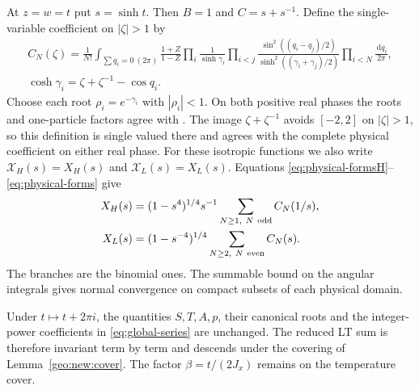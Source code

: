 \documentclass[11pt]{article}
\numberwithin{equation}{section}
\theoremstyle{definition}
\newcommand{\dd}{\,\mathrm d}
\begin{document}
At $z=w=t$ put $s=\sinh t$. Then $B=1$ and $C=s+s^{-1}$.
Define the single-variable coefficient on $|\zeta|>1$ by
\begin{equation}
 \begin{gathered}
 C_N(\zeta)=\frac1{N!}\int_{\sum q_i=0\ (2\pi)}
 \frac{1+Z}{1-Z}\prod_i\frac1{\sinh\gamma_i}
 \prod_{i<j}\frac{\sin^2((q_i-q_j)/2)}
                  {\sinh^2((\gamma_i+\gamma_j)/2)}
                  \prod_{i<N}\frac{\dd q_i}{2\pi},\\
 \cosh\gamma_i=\zeta+\zeta^{-1}-\cos q_i .
 \end{gathered}
 \label{eq:iso-coefficient}
\end{equation}
Choose each root $\rho_i=e^{-\gamma_i}$ with $|\rho_i|<1$.
On both positive real phases the roots and one-particle factors agree
with \cite[(3.17)--(3.18)]{ONGP}. The image
$\zeta+\zeta^{-1}$ avoids $[-2,2]$ on $|\zeta|>1$, so this
definition is single valued there and agrees with the complete
physical coefficient on either real phase. For these isotropic
functions we also write $\mathcal X_H(s)=X_H(s)$ and
$\mathcal X_L(s)=X_L(s)$. Equations
\eqref{eq:physical-formsH}--\eqref{eq:physical-forms} give
\begin{align}
 X_H(s)&=(1-s^4)^{1/4}s^{-1}
                   \sum_{N\ge1,\ N\ {\rm odd}}C_N(1/s),
                   \label{eq:iso-physicalH}\\
 X_L(s)&=(1-s^{-4})^{1/4}
                   \sum_{N\ge2,\ N\ {\rm even}}C_N(s).
 \label{eq:iso-physical}
\end{align}
The branches are the binomial ones. The summable bound on the angular
integrals gives normal convergence on compact subsets of each physical domain.

Under $t\mapsto t+2\pi i$, the quantities $S,T,A,p$, their canonical
roots and the integer-power coefficients in \eqref{eq:global-series}
are unchanged. The reduced LT sum is therefore invariant term by
term and descends under the covering of Lemma~\ref{geo:new:cover}.
The factor $\beta=t/(2J_x)$ remains on the temperature cover.
\end{document}
